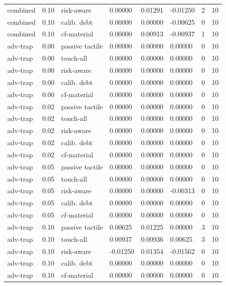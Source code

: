 \documentclass{article}
\begin{document}
\begin{center}
\begin{longtable}{llllllll}
combined & 0.10 & risk-aware & 0.00000 & 0.01291 & -0.01250 & 2 & 10 \\
combined & 0.10 & calib. debt & 0.00000 & 0.00000 & -0.00625 & 0 & 10 \\
combined & 0.10 & cf-material & 0.00000 & 0.00913 & -0.00937 & 1 & 10 \\
adv-trap & 0.00 & passive tactile & 0.00000 & 0.00000 & 0.00000 & 0 & 10 \\
adv-trap & 0.00 & touch-all & 0.00000 & 0.00000 & 0.00000 & 0 & 10 \\
adv-trap & 0.00 & risk-aware & 0.00000 & 0.00000 & 0.00000 & 0 & 10 \\
adv-trap & 0.00 & calib. debt & 0.00000 & 0.00000 & 0.00000 & 0 & 10 \\
adv-trap & 0.00 & cf-material & 0.00000 & 0.00000 & 0.00000 & 0 & 10 \\
adv-trap & 0.02 & passive tactile & 0.00000 & 0.00000 & 0.00000 & 0 & 10 \\
adv-trap & 0.02 & touch-all & 0.00000 & 0.00000 & 0.00000 & 0 & 10 \\
adv-trap & 0.02 & risk-aware & 0.00000 & 0.00000 & 0.00000 & 0 & 10 \\
adv-trap & 0.02 & calib. debt & 0.00000 & 0.00000 & 0.00000 & 0 & 10 \\
adv-trap & 0.02 & cf-material & 0.00000 & 0.00000 & 0.00000 & 0 & 10 \\
adv-trap & 0.05 & passive tactile & 0.00000 & 0.00000 & 0.00000 & 0 & 10 \\
adv-trap & 0.05 & touch-all & 0.00000 & 0.00000 & 0.00000 & 0 & 10 \\
adv-trap & 0.05 & risk-aware & 0.00000 & 0.00000 & -0.00313 & 0 & 10 \\
adv-trap & 0.05 & calib. debt & 0.00000 & 0.00000 & 0.00000 & 0 & 10 \\
adv-trap & 0.05 & cf-material & 0.00000 & 0.00000 & 0.00000 & 0 & 10 \\
adv-trap & 0.10 & passive tactile & 0.00625 & 0.01225 & 0.00000 & 3 & 10 \\
adv-trap & 0.10 & touch-all & 0.00937 & 0.00936 & 0.00625 & 3 & 10 \\
adv-trap & 0.10 & risk-aware & -0.01250 & 0.01354 & -0.01562 & 0 & 10 \\
adv-trap & 0.10 & calib. debt & 0.00000 & 0.00000 & 0.00000 & 0 & 10 \\
adv-trap & 0.10 & cf-material & 0.00000 & 0.00000 & 0.00000 & 0 & 10 \\
\bottomrule
\end{longtable}
\renewcommand{\arraystretch}{1.0}
\end{center}
\end{document}
